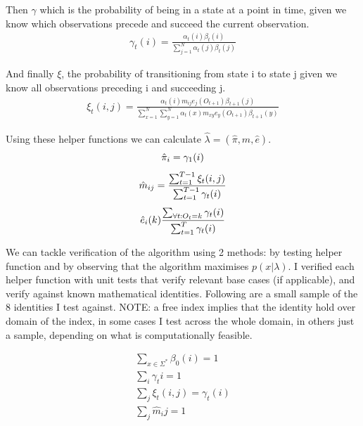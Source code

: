 Then $\gamma$ which is the probability of being in a state at a point in time, given we know which observations precede and succeed the current observation.
\begin{gather*}
    \gamma_t(i) = \frac{\alpha_t(i) \beta_t(i)}{\sum_{j=1}^N \alpha_t(j) \beta_t(j)}
\end{gather*}

And finally $\xi$, the probability of transitioning from state i to state j given we know all observations preceding i and succeeding j.
\begin{gather*}
    \xi_t(i, j) = \frac{\alpha_t(i) m_{ij} e_j(O_{t+1}) \beta_{t+1}(j)}{\sum_{x=1}^N \sum_{y=1}^N \alpha_t(x) m_{xy} e_y(O_{t+1}) \beta_{t+1}(y)}
\end{gather*}

Using these helper functions we can calculate $\hat{\lambda}=(\hat{\pi}, \hat{m}, \hat{e})$.
\begin{gather*}
    \hat{\pi}_i = \gamma_1(i)\biggbreak
    \hat{m}_{ij} = \frac{\sum_{t=1}^{T-1} \xi_t(i,j)}{\sum_{t=1}^{T-1} \gamma_t(i)}\biggbreak
    \hat{e}_i(k) \frac{\sum_{\forall t: O_t = k} \gamma_t(i)}{\sum_{t=1}^T \gamma_t(i)}
\end{gather*}


We can tackle verification of the algorithm using 2 methods: by testing helper function and by observing that the algorithm maximises $p(x|\lambda)$.
I verified each helper function with unit tests that verify relevant base cases (if applicable), and verify against known mathematical identities.
Following are a small sample of the 8 identities I test against.
NOTE: a free index implies that the identity hold over domain of the index, in some cases I test across the whole domain, in others just a sample, depending on what is computationally feasible.

\begin{gather*}
    \sum_{x \in \Sigma^*} \beta_0(i) = 1\\
    \sum_{i} \gamma_t{i} = 1\\
    \sum_{j} \xi_t(i,j) = \gamma_t(i)\\
    \sum_j \hat{m}_ij = 1\\
\end{gather*}


